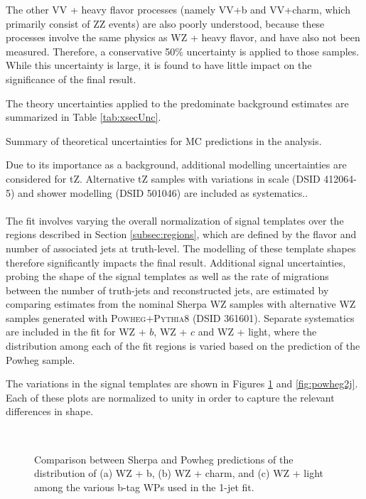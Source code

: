 The other VV + heavy flavor processes (namely VV+b and VV+charm, which primarily consist of ZZ events) are also poorly understood, because these processes involve the same physics as WZ + heavy flavor, and have also not been measured. Therefore, a conservative 50\% uncertainty is applied to those samples. While this uncertainty is large, it is found to have little impact on the significance of the final result.

The theory uncertainties applied to the predominate background estimates are summarized in Table \ref{tab:xsecUnc}. 

\begin{table}[H]
{\footnotesize
\centering

\caption{Summary of theoretical uncertainties for MC predictions in the analysis.}
\label{tab:xsecUnc}
}
\end{table}

Due to its importance as a background, additional modelling uncertainties are considered for tZ. Alternative tZ samples with variations in scale (DSID 412064-5) and shower modelling (DSID 501046) are included as systematics..

\paragraph{}
The fit involves varying the overall normalization of signal templates over the regions described in Section \ref{subsec:regions}, which are defined by the flavor and number of associated jets at truth-level. The modelling of these template shapes therefore significantly impacts the final result. Additional signal uncertainties, probing the shape of the signal templates as well as the rate of migrations between the number of truth-jets and reconstructed jets, are estimated by comparing estimates from the nominal Sherpa WZ samples with alternative WZ samples generated with \textsc{Powheg}+\textsc{Pythia8} (DSID 361601). Separate systematics are included in the fit for WZ + $b$, WZ + $c$ and WZ + light, where the distribution among each of the fit regions is varied based on the prediction of the Powheg sample.

The variations in the signal templates are shown in Figures \ref{fig:powheg1j} and \ref{fig:powheg2j}. Each of these plots are normalized to unity in order to capture the relevant differences in shape. 

\begin{figure}[H]
    \centering
    \\
    \caption{Comparison between Sherpa and Powheg predictions of the distribution of (a) WZ + b, (b) WZ + charm, and (c) WZ + light among the various b-tag WPs used in the 1-jet fit.}
\label{fig:powheg1j}
\end{figure}

